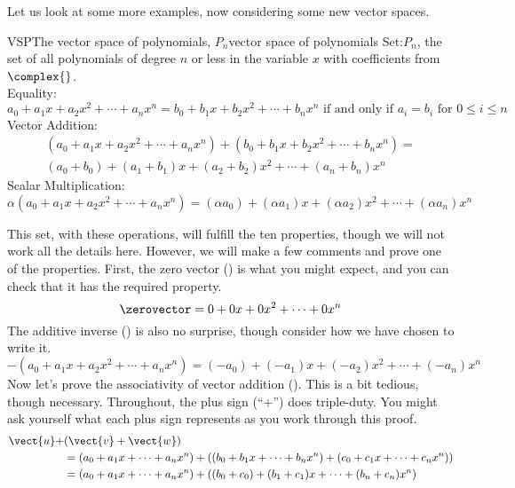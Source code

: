 %
Let us look at some more examples, now considering some new vector spaces.
%
\begin{example}{VSP}{The vector space of polynomials, $P_n$}{vector space of polynomials}
Set:\quad $P_n$, the set of all polynomials of degree $n$ or less in the variable $x$ with coefficients from $\complex{\null}$.\\
Equality:
%
\begin{equation*}
a_0+a_1x+a_2x^2+\cdots+a_nx^n=b_0+b_1x+b_2x^2+\cdots+b_nx^n
\text{ if and only if }a_i=b_i\text{ for }0\leq i\leq n
\end{equation*}
%
Vector Addition:
%
\begin{align*}
(a_0+a_1x+a_2x^2+\cdots+a_nx^n)+(b_0+b_1x+b_2x^2+\cdots+b_nx^n)=\\
(a_0+b_0)+(a_1+b_1)x+(a_2+b_2)x^2+\cdots+(a_n+b_n)x^n
\end{align*}
%
Scalar Multiplication:
\begin{equation*}
\alpha(a_0+a_1x+a_2x^2+\cdots+a_nx^n)=(\alpha a_0)+(\alpha a_1)x+(\alpha a_2)x^2+\cdots+(\alpha a_n)x^n
\end{equation*}
\par\medskip
%
This set, with these operations, will fulfill the ten properties, though we will not work all the details here.  However, we will make a few comments and prove one of the properties.  First, the zero vector () is what you might expect, and you can check that it has the required property.
%
\begin{equation*}
\zerovector=0+0x+0x^2+\cdots+0x^n
\end{equation*}
%
The additive inverse () is also no surprise, though consider how we have chosen to write it.
%
\begin{equation*}
-\left(a_0+a_1x+a_2x^2+\cdots+a_nx^n\right)=(-a_0)+(-a_1)x+(-a_2)x^2+\cdots+(-a_n)x^n
\end{equation*}
%
Now let's prove the associativity of vector addition ().  This is a bit tedious, though necessary.  Throughout, the plus sign (``+'') does triple-duty.  You might ask yourself what each plus sign represents as you work through this proof.
%
\begin{align*}
%
\vect{u}+&(\vect{v}+\vect{w})\\
%
&=(a_0+a_1x+\cdots+a_nx^n)+\left((b_0+b_1x+\cdots+b_nx^n)+(c_0+c_1x+\cdots+c_nx^n)\right)\\
%
&=(a_0+a_1x+\cdots+a_nx^n)+((b_0+c_0)+(b_1+c_1)x+\cdots+(b_n+c_n)x^n)\\

\end{align*}
\end{example}

